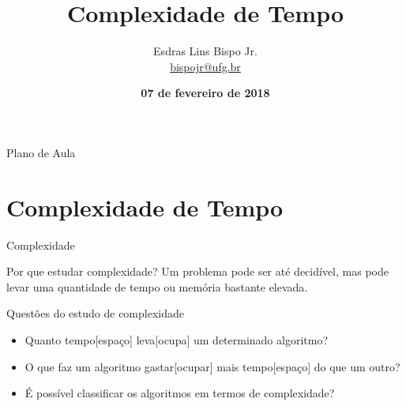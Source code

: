 \documentclass[xcolor=dvipsnames,table]{beamer}
\title{Complexidade de Tempo}
\author{
  Esdras Lins Bispo Jr. \\ \url{bispojr@ufg.br}
  }
\institute{
  Teoria da Computação \\Bacharelado em Ciência da Computação}
\date{\textbf{07 de fevereiro de 2018} }
\begin{document}
	\begin{frame}
		\titlepage
	\end{frame}

	\AtBeginSection{
		\begin{frame}{Sumário}%
    		\tableofcontents[currentsection]
		\end{frame}
	}

	\begin{frame}{Plano de Aula}
		\tableofcontents
	\end{frame}
    
    
		\section{Complexidade de Tempo}	
	\begin{frame}{Complexidade}
		\begin{block}{Por que estudar complexidade?}
			Um problema pode ser até decidível, mas pode levar uma quantidade de tempo ou memória bastante elevada.
		\end{block} \pause
		\begin{block}{Questões do estudo de complexidade}
			\begin{itemize}
				\item Quanto tempo[espaço] leva[ocupa] um determinado algoritmo?
				\item O que faz um algoritmo gastar[ocupar] mais tempo[espaço] do que um outro?
				\item É possível classificar os algoritmos em termos de complexidade?
			\end{itemize}
		\end{block}
	\end{frame}
	
\end{document}
